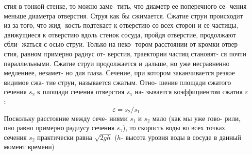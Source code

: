 \begin{minipage}[t]{0.44\textwidth}
    стия в тонкой стенке, то можно заме-\linebreak
    тить, что диаметр ее поперечного се-\linebreak
    чения меньше диаметра отверстия.\linebreak
    Струя как бы сжимается. Сжатие\linebreak
    струи происходит из-за того, что жид-\linebreak
    кость подтекает к отверстию со всех\linebreak
    сторон и ее частицы, движущиеся\linebreak
    к отверстию вдоль стенок сосуда,\linebreak
    пройдя отверстие, продолжают сбли-\linebreak
    жаться с осью струи. Только на неко-\linebreak
    тором расстоянии от кромки отвер-\linebreak
    стия, равном примерно радиус от-\linebreak
    верстия, траектории частиц становят-\linebreak
    ся почти параллельными. Сжатие\linebreak
    струи продолжается и дальше, но\linebreak
    уже несравненно медленнее, незамет-\linebreak
    но для глаза. Сечение, при котором\linebreak
    заканчивается резкое видимое сжа-\linebreak
    тие струи, называется сжатым. Отно-\linebreak
    шение площади сжатого сечения $s_2$\linebreak
    к площади сечения отверстия $s_1$ на-\linebreak
    зывается коэффициентом сжатия $\varepsilon$:
    $$\varepsilon = s_2/s_1$$
    Поскольку расстояние между сече-\linebreak
    ниями $s_1$ и $s_2$ мало (как мы уже гово-\linebreak
    рили, оно равно примерно радиусу\linebreak
    сечения $s_1$), то скорость воды во всех\linebreak
    точках сечения $s_2$ практически равна\linebreak
    $\sqrt{2gh}$ ($h$- высота уровня воды\linebreak
    в сосуде в данный момент времени)\linebreak

\end{minipage}
